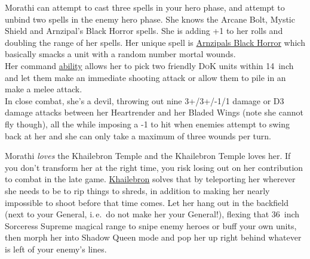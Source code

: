 Morathi can attempt to cast three spells in your hero phase, and attempt to
unbind two spells in the enemy hero phase. She knows the Arcane Bolt, Mystic
Shield and Arnzipal's Black Horror spells.  She is adding +1 to her rolls and
doubling the range of her spells.  Her unique spell is
\hyperref[spell:arnzipals-black-horror]{Arnzipals Black Horror} which basically
smacks a unit with a random number mortal wounds.\\
Her command \hyperref[worship-through-bloodshed]{ability} allows her to pick
two friendly \textsc{DoK} units within 14~inch and let them make an immediate shooting
attack or allow them to pile in an make a melee attack.\\
In close combat, she's a devil, throwing out nine 3+/3+/-1/1 damage or
D3 damage attacks between her Heartrender and her Bladed Wings (note she cannot
fly though), all the while imposing a -1 to hit when enemies attempt to swing
back at her and she can only take a maximum of three wounds per turn. 

Morathi \emph{loves} the Khailebron Temple and the Khailebron Temple loves her.
If you don't transform her at the right time, you risk losing out on her
contribution to combat in the late game.
\hyperref[temple:khailebron]{Khailebron} solves that by teleporting her
wherever she needs to be to rip things to shreds, in addition to making her
nearly impossible to shoot before that time comes. Let her hang out in the
backfield (next to your General, i.\,e.\, do not make her your General!),
flexing that 36~inch Sorceress Supreme magical range to snipe enemy heroes or
buff your own units, then morph her into Shadow Queen mode and pop her up right
behind whatever is left of your enemy's lines. 

